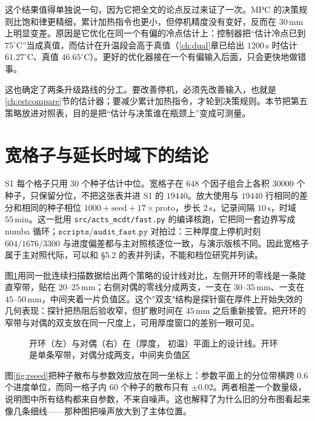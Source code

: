 这个结果值得单独说一句，因为它把全文的论点反过来证了一次。MPC 的决策规则比饱和律更精细，累计加热指令也更小，但停机精度没有变好，反而在 \(30\,\mathrm{mm}\) 上明显变差。原因是它优化在同一个有偏的冷点估计上：控制器把“估计冷点已到 \(75^\circ\mathrm{C}\)”当成真值，而估计在升温段会高于真值（\ref{ch:dual}{}章已给出 \(1200\,\mathrm{s}\) 时估计 \(61.27^\circ\mathrm{C}\)、真值 \(46.65^\circ\mathrm{C}\)）。更好的优化器接在一个有偏输入后面，只会更快地做错事。

这也确定了两条升级路线的分工。要改善停机，必须先改善输入，也就是\ref{ch:estcompare}{}节的估计器；要减少累计加热指令，才轮到决策规则。本节把第五策略放进对照表，目的是把“估计与决策谁在瓶颈上”变成可测量。

\section{宽格子与延长时域下的结论}
\label{ch:wide}

S1 每个格子只用 \(30\) 个种子估计中位。宽格子在 \(648\) 个因子组合上各积 \(30000\) 个种子，只保留分位，不把这张表并进 S1 的 \(19440\)。放大使用与 \(19440\) 行相同的差分和相同的种子相位 \(1000+\mathrm{seed}+17\times\mathrm{proto}\)，步长 \(2\,\mathrm{s}\)，记录间隔 \(10\,\mathrm{s}\)，时域 \(55\,\mathrm{min}\)。这一批用 \texttt{src/acts\_mcdt/fast.py} 的编译核跑，它把同一套边界写成 numba 循环；\(\texttt{scripts/audit\_fast.py}\) 对拍过：三种厚度上停机时刻 \(604/1676/3300\) 与进度偏差都与主对照核逐位一致，与演示版核不同。因此宽格子属于主对照代际，可以和 \S5.2 的表并列读，不能和档位研究并列读。

图\ref{fig:rwide}{}用同一批连续扫描数据给出两个策略的设计线对比，左侧开环的零线是一条陡直窄带，贴在 \(20\)--\(25\,\mathrm{mm}\)；右侧对偶的零线分成两支，一支在 \(30\)--\(35\,\mathrm{mm}\)、一支在 \(45\)--\(50\,\mathrm{mm}\)，中间夹着一片负值区。这个"双支"结构是探针窗在厚件上开始失效的几何表现：探针把热阻后验收窄，但扩散时间在 \(45\,\mathrm{mm}\) 之后重新接管。把开环的窄带与对偶的双支放在同一尺度上，可用厚度窗口的差别一眼可见。

\begin{figure}[t]
\centering
{}
\caption{开环（左）与对偶（右）在（厚度， 初温）平面上的设计线。开环是单条窄带，对偶分成两支，中间夹负值区}
\label{fig:rwide}
\end{figure}

图\ref{fig:rseed}{}把种子散布与参数效应放在同一坐标上：参数平面上的分位带横跨 \(0.6\) 个进度单位，而同一格子内 60 个种子的散布只有 \(\pm0.02\)。两者相差一个数量级，说明图中所有结构都来自参数，不来自噪声。这也解释了为什么旧的分布图看起来像几条细线——那种图把噪声放大到了主体位置。

